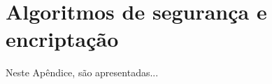 
\chapter{Algoritmos de segurança e encriptação} %
\label{apd:6:complementacao}

Neste Apêndice, são apresentadas...



